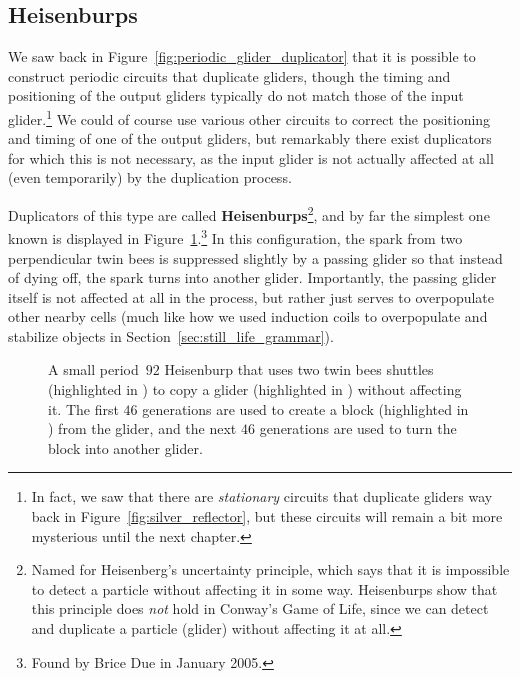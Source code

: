\subsection{Heisenburps}\label{sec:p46_heisenburps}

We saw back in Figure~\ref{fig:periodic_glider_duplicator} that it is possible to construct periodic circuits that duplicate gliders, though the timing and positioning of the output gliders typically do not match those of the input glider.\footnote{In fact, we saw that there are \emph{stationary} circuits that duplicate gliders way back in Figure~\ref{fig:silver_reflector}, but these circuits will remain a bit more mysterious until the next chapter.} We could of course use various other circuits to correct the positioning and timing of one of the output gliders, but remarkably there exist duplicators for which this is not necessary, as the input glider is not actually affected at all (even temporarily) by the duplication process.

Duplicators of this type are called \textbf{Heisenburps}\footnote{Named for Heisenberg's uncertainty principle, which says that it is impossible to detect a particle without affecting it in some way. Heisenburps show that this principle does \emph{not} hold in Conway's Game of Life, since we can detect and duplicate a particle (glider) without affecting it at all.}, and by far the simplest one known is displayed in Figure~\ref{fig:p46_natural_heisenburp}.\footnote{Found by Brice Due in January 2005.} In this configuration, the spark from two perpendicular twin bees is suppressed slightly by a passing glider so that instead of dying off, the spark turns into another glider. Importantly, the passing glider itself is not affected at all in the process, but rather just serves to overpopulate other nearby cells (much like how we used induction coils to overpopulate and stabilize objects in Section~\ref{sec:still_life_grammar}).

\begin{figure}[!htb]
	\centering
	\caption{A small period~$92$ Heisenburp that uses two twin bees shuttles (highlighted in ) to copy a glider (highlighted in ) without affecting it. The first $46$ generations are used to create a block (highlighted in ) from the glider, and the next $46$ generations are used to turn the block into another glider.}\label{fig:p46_natural_heisenburp}
\end{figure}

